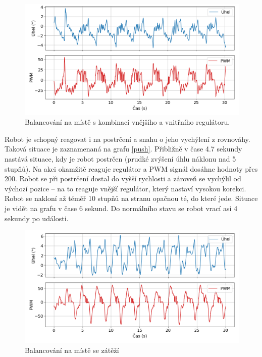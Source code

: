 \begin{figure}[H]
  \centering
  \includegraphics[width=1.0\linewidth]{obrazky-figures/normal.png}%
  \caption{Balancování na místě s kombinací vnějšího a vnitřního regulátoru.}
  \label{normal}
\end{figure}

Robot je schopný reagovat i na postrčení a snahu o jeho vychýlení z rovnováhy. Taková situace je zaznamenaná na grafu \ref{push}. Přibližně v čase 4.7 sekundy nastává situace, kdy je robot postrčen (prudké zvýšení úhlu náklonu nad 5 stupňů). Na akci okamžitě reaguje regulátor a PWM signál dosáhne hodnoty přes 200. Robot se při postrčení dostal do vyšší rychlosti a zároveň se vychýlil od výchozí pozice -- na to reaguje vnější regulátor, který nastaví vysokou korekci. Robot se nakloní až téměř 10 stupňů na stranu opačnou té, do které jede. Situace je vidět na grafu v čase 6 sekund. Do normálního stavu se robot vrací asi 4 sekundy po události.

\begin{figure}[H]
  \centering
  \includegraphics[width=1.0\linewidth]{obrazky-figures/load1.png}%
  \caption{Balancování na místě se zátěží}
  \label{load}
\end{figure}

